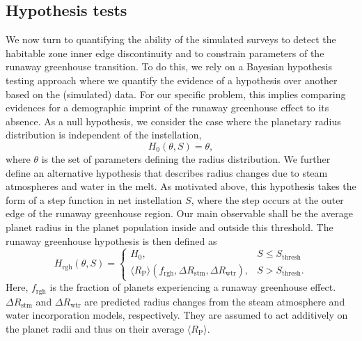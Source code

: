 \documentclass[twocolumn,twocolappendix]{aastex631}
\begin{document}
\subsection{Hypothesis tests}
We now turn to quantifying the ability of the simulated surveys to detect the habitable zone inner edge discontinuity and to constrain parameters of the runaway greenhouse transition.
To do this, we rely on a Bayesian hypothesis testing approach where we quantify the evidence of a hypothesis over another based on the (simulated) data.
For our specific problem, this implies comparing evidences for a demographic imprint of the runaway greenhouse effect to its absence.
    As a null hypothesis, we consider the case where the planetary radius distribution is independent of the instellation,
    \begin{equation}
        H_0(\theta, S) = \theta,
    \end{equation}
    where $\theta$ is the set of parameters defining the radius distribution.
    We further define an alternative hypothesis that describes radius changes due to steam atmospheres and water in the melt.
    As motivated above, this hypothesis takes the form of a step function in net instellation $S$, where the step occurs at the outer edge of the runaway greenhouse region.
    Our main observable shall be the average planet radius in the planet population inside and outside this threshold.
    The runaway greenhouse hypothesis is then defined as
\begin{equation}\label{eq:rgh_hypo}
    H_{\mathrm{rgh}}(\theta, S) =
        \begin{cases}
            H_0, &  S \leq S_\mathrm{thresh}\\
            \langle R_\mathrm{P}\rangle (f_\mathrm{rgh},\Delta R_\mathrm{stm}, \Delta R_\mathrm{wtr}), &  S > S_\mathrm{thresh}.
        \end{cases}
\end{equation}
    Here, $f_\mathrm{rgh}$ is the fraction of planets experiencing a runaway greenhouse effect.
    $\Delta R_\mathrm{stm}$ and $\Delta R_\mathrm{wtr}$ are predicted radius changes from the steam atmosphere and water incorporation models, respectively.
    They are assumed to act additively on the planet radii and thus on their average $\langle R_\mathrm{P}\rangle $.
\end{document}
